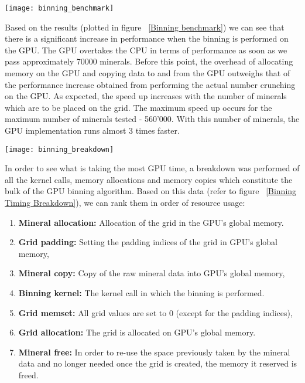 \documentclass[11pt]{IEEEtran}
\begin{document}
\begin{figure*}[ht]
\begin{center}
\caption[grid]{Binning aggregation benchmark}
\label{Binning benchmark}
\texttt{[image: binning\_benchmark]}
\end{center}
\end{figure*}

Based on the results (plotted in figure ~\ref{Binning benchmark}) we can see that there is a significant increase in performance when the binning is performed on the GPU. The GPU overtakes the CPU in terms of performance as soon as we pass approximately 70000 minerals. Before this point, the overhead of allocating memory on the GPU and copying data to and from the GPU outweighs that of the performance increase obtained from performing the actual number crunching on the GPU. As expected, the speed up increases with the number of minerals which are to be placed on the grid. The maximum speed up occurs for the maximum number of minerals tested - 560'000. With this number of minerals, the GPU implementation runs almost 3 times faster.\\

\begin{figure*}[ht]
\begin{center}
\caption[grid]{Binning Timing Breakdown}
\label{Binning Timing Breakdown}
\texttt{[image: binning\_breakdown]}
\end{center}
\end{figure*}

In order to see what is taking the most GPU time, a breakdown was performed of all the kernel calls, memory allocations and memory copies which constitute the bulk of the GPU binning algorithm. Based on this data (refer to figure ~\ref{Binning Timing Breakdown}), we can rank them in order of resource usage:
\begin{enumerate}
\item \textbf{Mineral allocation: } Allocation of the grid in the GPU's global memory.
\item \textbf{Grid padding: } Setting the padding indices of the grid in GPU's global memory,
\item \textbf{Mineral copy: } Copy of the raw mineral data into GPU's global memory,
\item \textbf{Binning kernel: } The kernel call in which the binning is performed.
\item \textbf{Grid memset: } All grid values are set to 0 (except for the padding indices),
\item \textbf{Grid allocation: } The grid is allocated on GPU's global memory.
\item \textbf{Mineral free: } In order to re-use the space previously taken by the mineral data and no longer needed once the grid is created, the memory it reserved is freed.
\end{enumerate}
\end{document}
